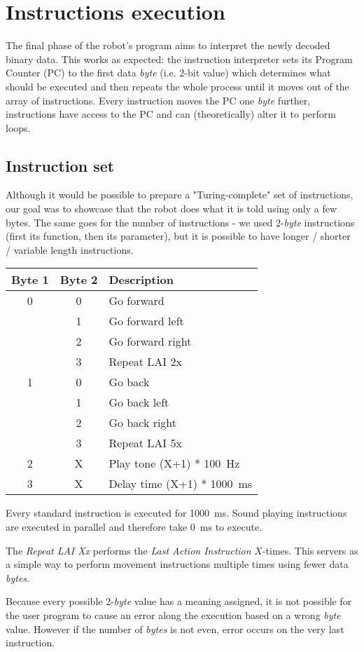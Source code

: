 \section{Instructions execution}
The final phase of the robot's program aims to interpret the newly decoded
binary data. This works as expected: the instruction interpreter sets its
Program Counter (PC) to the first data \textit{byte} (i.e. 2-bit value)
which determines what should be executed and then repeats the whole
process until it moves out of the array of instructions. Every
instruction moves the PC one \textit{byte} further, instructions have
access to the PC and can (theoretically) alter it to perform loops.

\subsection{Instruction set}
Although it would be possible to prepare a "Turing-complete" set
of instructions, our goal was to showcase that the robot does what it is
told using only a few bytes.
The same goes for the number of instructions - we used 2-\textit{byte}
instructions (first its function, then its parameter), but it is
possible to have longer / shorter / variable length instructions.

\begin{center}
\begin{tabular}{|c|c||l|}
\hline
\textbf{Byte 1}   &   \textbf{Byte 2}   &   \textbf{Description}\\
\hline
\hline
    0   &   0       &   Go forward\\
        &   1       &   Go forward left\\
        &   2       &   Go forward right\\
        &   3       &   Repeat LAI 2x\\
\hline
    1   &   0       &   Go back\\
        &   1       &   Go back left\\
        &   2       &   Go back right\\
        &   3       &   Repeat LAI 5x\\
\hline
    2   &   X       &   Play tone (X+1) * 100~Hz\\
\hline
    3   &   X       &   Delay time (X+1) * 1000~ms\\
 \hline
 \end{tabular}
\end{center}

Every standard instruction is executed for 1000~ms. Sound playing
instructions are executed in parallel and therefore take 0~ms to execute.

The \textit{Repeat LAI Xx} performs the \textit{Last Action Instruction}
$X$-times. This servers as a simple way to perform movement instructions
multiple times using fewer data \textit{bytes}.

Because every possible 2-\textit{byte} value has a meaning assigned,
it is not possible for the user program to cause an error along the
execution based on a wrong \textit{byte} value. However if the number
of \textit{bytes} is not even, error occurs on the very last instruction.


